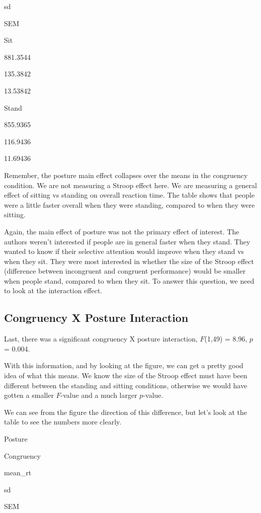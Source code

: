 \documentclass[
]{book}
\begin{document}
sd

SEM

Sit

881.3544

135.3842

13.53842

Stand

855.9365

116.9436

11.69436

Remember, the posture main effect collapses over the means in the congruency condition. We are not measuring a Stroop effect here. We are measuring a general effect of sitting vs standing on overall reaction time. The table shows that people were a little faster overall when they were standing, compared to when they were sitting.

Again, the main effect of posture was not the primary effect of interest. The authors weren't interested if people are in general faster when they stand. They wanted to know if their selective attention would improve when they stand vs when they sit. They were most interested in whether the size of the Stroop effect (difference between incongruent and congruent performance) would be smaller when people stand, compared to when they sit. To answer this question, we need to look at the interaction effect.

\hypertarget{congruency-x-posture-interaction}{%
\subsection{Congruency X Posture Interaction}\label{congruency-x-posture-interaction}}

Last, there was a significant congruency X posture interaction, \(F\)(1,49) = 8.96, \(p\) = 0.004.

With this information, and by looking at the figure, we can get a pretty good idea of what this means. We know the size of the Stroop effect must have been different between the standing and sitting conditions, otherwise we would have gotten a smaller \(F\)-value and a much larger \(p\)-value.

We can see from the figure the direction of this difference, but let's look at the table to see the numbers more clearly.

Posture

Congruency

mean\_rt

sd

SEM
\end{document}
